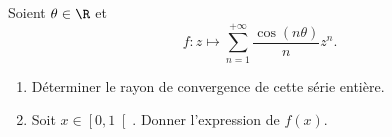\begin{enonce}
\begin{exercise}[ID={RMS128 E703},subtitle={Mines-Ponts PSI 2017},tags={}, difficulty={0}]
Soient $\theta\in\R$ et
\begin{equation*}
  f: z\mapsto \sum_{n=1}^{+\infty} \frac{\cos(n\theta)}{n} z^n.
\end{equation*}
\begin{enumerate}
  \item Déterminer le rayon de convergence de cette série entière.
  \item Soit $x\in\left[0,1\right[$. Donner l'expression de $f(x)$.
\end{enumerate}
\end{exercise}
\begin{solution}
\end{solution}
\end{enonce}
